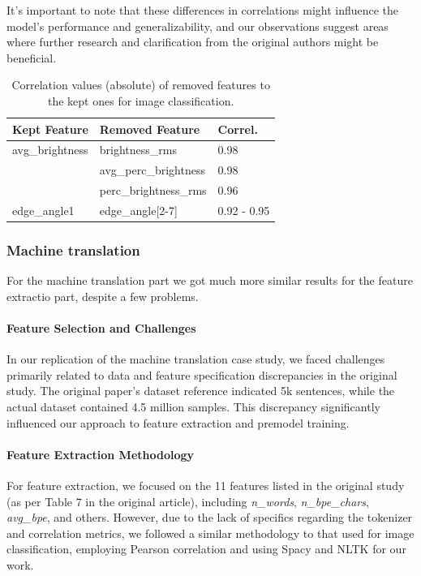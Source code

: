 It's important to note that these differences in correlations might influence the model's performance and generalizability, and our observations suggest areas where further research and clarification from the original authors might be beneficial.

\begin{table}[h]
  \centering
  \caption{Correlation values (absolute) of removed features to the kept ones for image classification.}
  \begin{tabular}{lll}
    \hline
    \textbf{Kept Feature} & \textbf{Removed Feature} & \textbf{Correl.} \\ \hline
    avg\_brightness       & brightness\_rms          & 0.98             \\
                          & avg\_perc\_brightness    & 0.98             \\
                          & perc\_brightness\_rms    & 0.96             \\
    edge\_angle1          & edge\_angle[2-7]         & 0.92 - 0.95      \\ \hline
  \end{tabular}
\end{table}



\subsubsection{Machine translation}
For the machine translation part we got much more similar results for the feature extractio part, despite a few problems.

\paragraph{Feature Selection and Challenges}
In our replication of the machine translation case study, we faced challenges primarily related to data and feature specification discrepancies in the original study. The original paper's dataset reference indicated 5k sentences, while the actual dataset contained 4.5 million samples. This discrepancy significantly influenced our approach to feature extraction and premodel training.

\paragraph{Feature Extraction Methodology}
For feature extraction, we focused on the 11 features listed in the original study (as per Table 7 in the original article), including \textit{n\_words}, \textit{n\_bpe\_chars}, \textit{avg\_bpe}, and others. However, due to the lack of specifics regarding the tokenizer and correlation metrics, we followed a similar methodology to that used for image classification, employing Pearson correlation and using Spacy and NLTK for our work.

